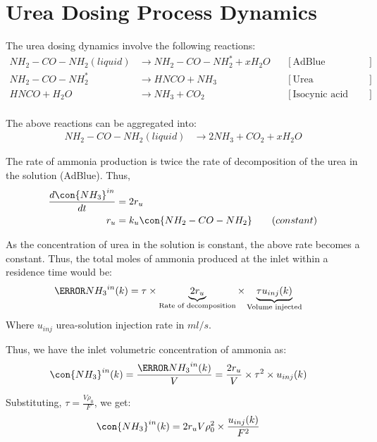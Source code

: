 \section{Urea Dosing Process Dynamics}
The urea dosing dynamics involve the following reactions:
\begin{align*}
    NH_2 - CO - NH_2 (liquid) &\longrightarrow NH_2 - CO - NH_2^* + x H_2 O
                & &[\text{AdBlue evaporation}] \\
    NH_2 - CO - NH_2^*  &\longrightarrow  HNCO + NH_3
                & &[\text{Urea decomposition}] \\
    HNCO + H_2O &\longrightarrow NH_3 + CO_2
                & &[\text{Isocynic acid hydrolysis}] \\
\end{align*}

The above reactions can be aggregated into:
\begin{align*}
    NH_2 - CO - NH_2 (liquid) &\longrightarrow 2 NH_3 + CO_2 + x H_2 O
\end{align*}

The rate of ammonia production is twice the rate of decomposition of the urea in the solution (AdBlue). Thus,
\begin{align*}
    \frac{d \con{NH_3}^{in}}{dt} &= 2 r_{u}\\
    r_{u} &= k_{u} \con{NH_2 - CO - NH_2} \qquad (constant)
\end{align*}

As the concentration of urea in the solution is constant, the above rate becomes a constant. Thus, the total moles of
ammonia produced at the inlet within a residence time would be:
\begin{align*}
    \mol{NH_3}^{in} (k) &= \tau \times \underbrace{2 r_{u}}_{\text{Rate of decomposition}} \times \underbrace{\tau u_{inj} (k)}_{\text{Volume injected}}
\end{align*}
Where $u_{inj}$ urea-solution injection rate in $ml/s$.

Thus, we have the inlet volumetric concentration of ammonia as:
\begin{align*}
    \con{NH_3}^{in} (k) &= \frac{\mol{NH_3}^{in} (k)}{V}
                          = \frac{2 r_u}{V} \times \tau^2 \times u_{inj} (k)
\end{align*}

Substituting, $\tau = \frac{V \rho_0}{F}$, we get:
\begin{align}
    \con{NH_3}^{in} (k) &= 2r_u V \rho^2_0 \times \frac{u_{inj}(k)}{F^2}
\end{align}


